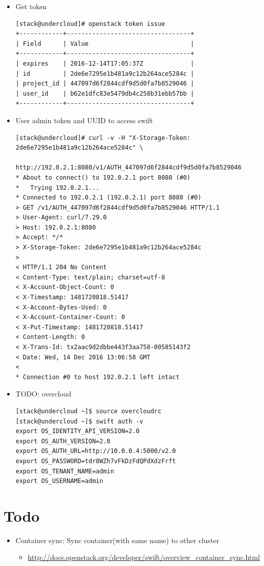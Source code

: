 \documentclass{article}
\begin{document}
\begin{itemize}
\begin{itemize}
\item Get token

\begin{verbatim}
[stack@undercloud]# openstack token issue
+------------+----------------------------------+
| Field      | Value                            |
+------------+----------------------------------+
| expires    | 2016-12-14T17:05:37Z             |
| id         | 2de6e7295e1b481a9c12b264ace5284c |
| project_id | 447097d6f2844cdf9d5d0fa7b8529046 |
| user_id    | b62e1dfc83e5479db4c258b31ebb57bb |
+------------+----------------------------------+
\end{verbatim}

\item User admin token and UUID to access swift

\begin{verbatim}
[stack@undercloud]# curl -v -H "X-Storage-Token: 2de6e7295e1b481a9c12b264ace5284c" \
			   http://192.0.2.1:8080/v1/AUTH_447097d6f2844cdf9d5d0fa7b8529046
* About to connect() to 192.0.2.1 port 8080 (#0)
*   Trying 192.0.2.1...
* Connected to 192.0.2.1 (192.0.2.1) port 8080 (#0)
> GET /v1/AUTH_447097d6f2844cdf9d5d0fa7b8529046 HTTP/1.1
> User-Agent: curl/7.29.0
> Host: 192.0.2.1:8080
> Accept: */*
> X-Storage-Token: 2de6e7295e1b481a9c12b264ace5284c
>
< HTTP/1.1 204 No Content
< Content-Type: text/plain; charset=utf-8
< X-Account-Object-Count: 0
< X-Timestamp: 1481720818.51417
< X-Account-Bytes-Used: 0
< X-Account-Container-Count: 0
< X-Put-Timestamp: 1481720818.51417
< Content-Length: 0
< X-Trans-Id: tx2aac9d2dbbe443f3aa758-00585143f2
< Date: Wed, 14 Dec 2016 13:06:58 GMT
<
* Connection #0 to host 192.0.2.1 left intact
\end{verbatim}
\end{itemize}
\end{itemize}


\begin{itemize}
\item TODO: overcloud

\begin{verbatim}
[stack@undercloud ~]$ source overcloudrc
[stack@undercloud ~]$ swift auth -v
export OS_IDENTITY_API_VERSION=2.0
export OS_AUTH_VERSION=2.0
export OS_AUTH_URL=http://10.0.0.4:5000/v2.0
export OS_PASSWORD=tdr8WZh7vFkDzFdQPdXdzFrft
export OS_TENANT_NAME=admin
export OS_USERNAME=admin
\end{verbatim}
\end{itemize}

\section{Todo}
\label{sec:org8940bcd}
\begin{itemize}
\item Container sync: Sync container(with same name) to other cluster
\begin{itemize}
\item \url{http://docs.openstack.org/developer/swift/overview\_container\_sync.html}
\end{itemize}
\end{itemize}
\end{document}
